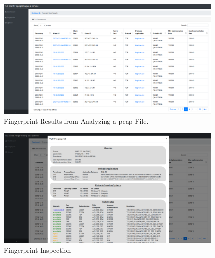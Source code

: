 \documentclass{book}
\begin{document}
\begin{figure}
	\centering %
   \includegraphics[scale=0.3]{ui_tls_fingerprinting_main.png}
	\caption{Fingerprint Results from Analyzing a pcap File.}
	\label{fig:ui-tls-fingerprint}
\end{figure}

\begin{figure}
	\centering %
   \includegraphics[scale=0.3]{ui_tls_fingerprinting.png}
	\caption{Fingerprint Inspection}
	\label{fig:ui-tls-fingerprint-inspection}
\end{figure}







 
\end{document}
